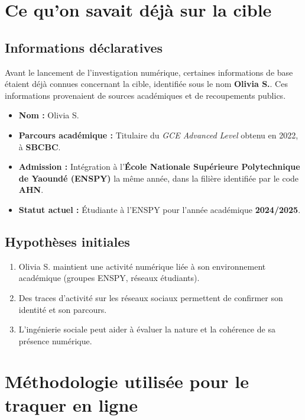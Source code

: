 \documentclass[a4paper,12pt]{report}
\begin{document}
\chapter{Ce qu'on savait déjà sur la cible}

\section{Informations déclaratives}

Avant le lancement de l’investigation numérique, certaines informations de base étaient déjà connues concernant la cible, identifiée sous le nom \textbf{Olivia S.}.  
Ces informations provenaient de sources académiques et de recoupements publics.

\begin{itemize}
	\item \textbf{Nom :} Olivia S.
	\item \textbf{Parcours académique :} Titulaire du \textit{GCE Advanced Level} obtenu en 2022,  à  \textbf{SBCBC}.
	\item \textbf{Admission :} Intégration à l’\textbf{École Nationale Supérieure Polytechnique de Yaoundé (ENSPY)} la même année, dans la filière identifiée par le code \textbf{AHN}.
	\item \textbf{Statut actuel :} Étudiante à l’ENSPY pour l’année académique \textbf{2024/2025}.
\end{itemize}

\section{Hypothèses initiales}

\begin{enumerate}
	\item Olivia S. maintient une activité numérique liée à son environnement académique (groupes ENSPY, réseaux étudiants).
	\item Des traces d’activité sur les réseaux sociaux permettent de confirmer son identité et son parcours.
	\item L’ingénierie sociale peut aider à évaluer la nature et la cohérence de sa présence numérique.
\end{enumerate}



\chapter{Méthodologie utilisée pour le traquer en ligne}
\end{document}
